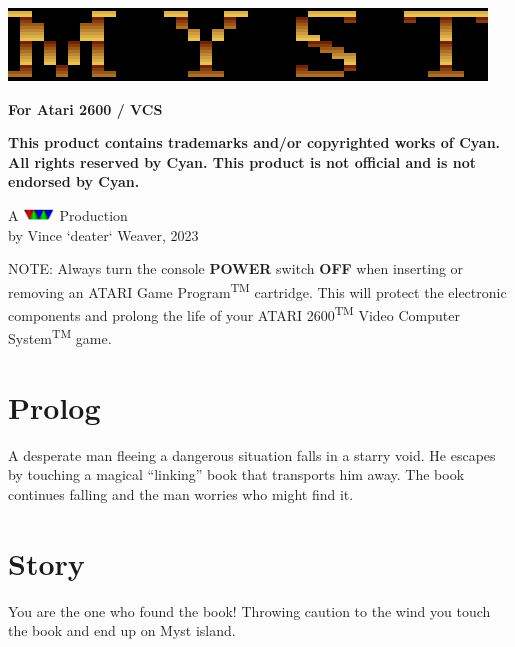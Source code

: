 \documentclass{book}
\begin{document}
\color{white}
\afterpage{\restorepagecolor}
\pagestyle{empty}

\begin{center}
\includegraphics{vcs_myst_title.png}
\end{center}

\begin{center}
{\bf For Atari 2600 / VCS}
\end{center}

\noindent
{\bf
This product contains trademarks and/or copyrighted works of Cyan.
All rights reserved by Cyan.
This product is not official and is not endorsed by Cyan. 
}

\begin{center}
A \includegraphics[width=0.33in]{vmw_logo.png} Production\\
by Vince `deater` Weaver, 2023
\end{center}

\pagebreak
\color{black}
\pagestyle{fancy}
\setcounter{page}{1}

\mbox{}
\vfill
\noindent
NOTE: Always turn the console {\bf POWER} switch {\bf OFF} when inserting
or removing an ATARI Game Program\textsuperscript{TM} cartridge.
This will protect the electronic components and prolong 
the life of your ATARI 2600\textsuperscript{TM} Video Computer
System\textsuperscript{TM} game.

\pagebreak

\section*{Prolog}
	A desperate man fleeing a dangerous situation falls
	in a starry void.  He escapes by touching a magical
	``linking'' book that transports him away.  The book
	continues falling and the man worries who might find it.
\vfill

\pagebreak

\section*{Story}
	You are the one who found the book!  Throwing caution
	to the wind you touch the book and end up on Myst island.
\end{document}
